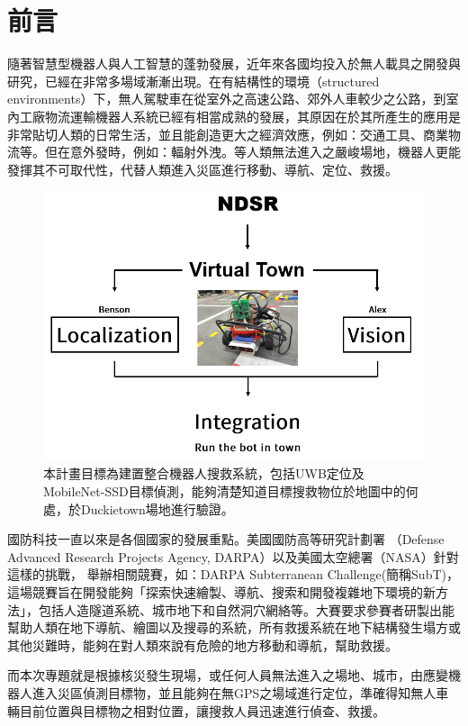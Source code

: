 \section{前言}

隨著智慧型機器人與人工智慧的蓬勃發展，近年來各國均投入於無人載具之開發與研究，已經在非常多場域漸漸出現。在有結構性的環境（structured environments）下，無人駕駛車在從室外之高速公路、郊外人車較少之公路，到室內工廠物流運輸機器人系統已經有相當成熟的發展，其原因在於其所產生的應用是非常貼切人類的日常生活，並且能創造更大之經濟效應，例如：交通工具、商業物流等。但在意外發時，例如：輻射外洩。等人類無法進入之嚴峻場地，機器人更能發揮其不可取代性，代替人類進入災區進行移動、導航、定位、救援。

\begin{figure}[t]
  \centering
    \includegraphics[width=\columnwidth]{images/teaser.png}
        \caption{本計畫目標為建置整合機器人搜救系統，包括UWB定位及MobileNet-SSD目標偵測，能夠清楚知道目標搜救物位於地圖中的何處，於Duckietown場地進行驗證。}
 \label{figure:teaser}
\end{figure}

國防科技一直以來是各個國家的發展重點。美國國防高等研究計劃署 （Defense Advanced Research Projects Agency, DARPA）以及美國太空總署（NASA）針對這樣的挑戰， 舉辦相關競賽，如：DARPA Subterranean Challenge(簡稱SubT)，這場競賽旨在開發能夠「探索快速繪製、導航、搜索和開發複雜地下環境的新方法」，包括人造隧道系統、城市地下和自然洞穴網絡等。大賽要求參賽者研製出能幫助人類在地下導航、繪圖以及搜尋的系統，所有救援系統在地下結構發生塌方或其他災難時，能夠在對人類來說有危險的地方移動和導航，幫助救援。

而本次專題就是根據核災發生現場，或任何人員無法進入之場地、城市，由應變機器人進入災區偵測目標物，並且能夠在無GPS之場域進行定位，準確得知無人車輛目前位置與目標物之相對位置，讓搜救人員迅速進行偵查、救援。

